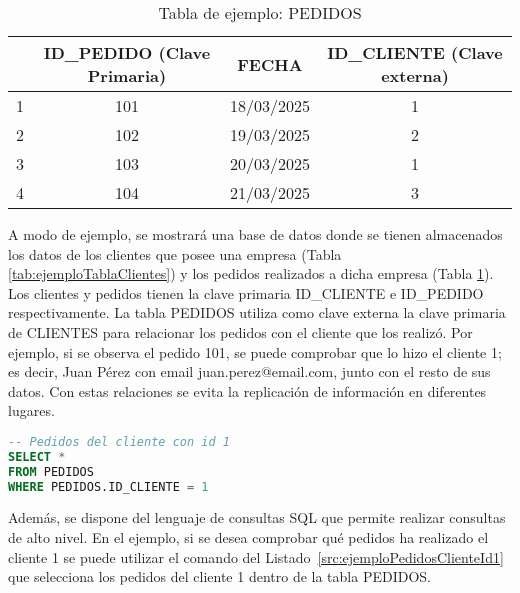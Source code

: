 \begin{table}[H]
\centering
\begin{tabular}{l|c|c|c|}
\cline{2-4}
 & \cellcolor[HTML]{C0C0C0}ID\_PEDIDO (\textbf{Clave Primaria}) & \cellcolor[HTML]{C0C0C0}FECHA & \cellcolor[HTML]{C0C0C0}ID\_CLIENTE (\textbf{Clave externa}) \\ \hline
\multicolumn{1}{|l|}{1} & 101 & 18/03/2025 & 1 \\ \hline
\multicolumn{1}{|l|}{2} & 102 & 19/03/2025 & 2 \\ \hline
\multicolumn{1}{|l|}{3} & 103 & 20/03/2025 & 1 \\ \hline
\multicolumn{1}{|l|}{4} & 104 & 21/03/2025 & 3 \\ \hline
\end{tabular}
\caption{Tabla de ejemplo: PEDIDOS}
\label{tab:ejemploTablaPedidos}
\end{table}

A modo de ejemplo, se mostrará una base de datos donde se tienen almacenados los datos de los clientes que posee una empresa (Tabla \ref{tab:ejemploTablaClientes}) y los pedidos realizados a dicha empresa (Tabla \ref{tab:ejemploTablaPedidos}). Los clientes y pedidos tienen la clave primaria ID\_CLIENTE e ID\_PEDIDO respectivamente. La tabla PEDIDOS utiliza como clave externa la clave primaria de CLIENTES para relacionar los pedidos con el cliente que los realizó. Por ejemplo, si se observa el pedido 101, se puede comprobar que lo hizo el cliente 1; es decir, Juan Pérez con email juan.perez@email.com, junto con el resto de sus datos. Con estas relaciones se evita la replicación de información en diferentes lugares. 

\begin{lstlisting}[language=SQL,
                   frame=none,
                   numbers=none,
                   basicstyle=\ttfamily\normalsize,
                   caption={Seleccion de pedidos del cliente 1},
                   label=src:ejemploPedidosClienteId1,
                   inputencoding=utf8]                   
-- Pedidos del cliente con id 1
SELECT *
FROM PEDIDOS
WHERE PEDIDOS.ID_CLIENTE = 1
\end{lstlisting}

Además, se dispone del lenguaje de consultas SQL que permite realizar consultas de alto nivel. En el ejemplo, si se desea comprobar qué pedidos ha realizado el cliente 1 se puede utilizar el comando del Listado~\ref{src:ejemploPedidosClienteId1} que selecciona los pedidos del cliente 1 dentro de la tabla PEDIDOS.

